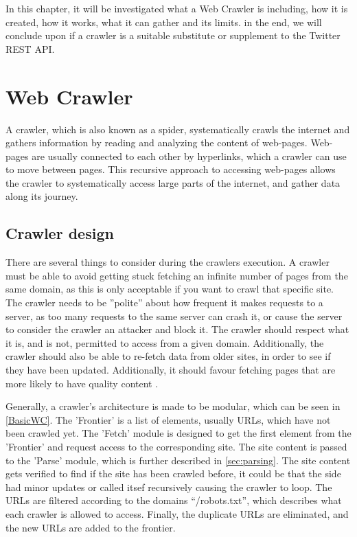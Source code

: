 In this chapter, it will be investigated what a Web Crawler is including, how it
is created, how it works, what it can gather and its limits. in the end, we will
conclude upon if a crawler is a suitable substitute or supplement to
the Twitter \ac{REST} \ac{API}.

\section{Web Crawler}\label{subsec:crawler}
A crawler, which is also known as a spider, systematically crawls the internet
and gathers information by reading and analyzing the content of web-pages.
Web-pages are usually connected to each other by hyperlinks, which a
crawler can use to move between pages. This recursive approach to accessing
web-pages allows the crawler to systematically access large parts of the
internet, and gather data along its journey. \Source %

\subsection{Crawler design}%
There are several things to consider during the crawlers execution. A crawler
must be able to avoid getting stuck fetching an infinite number of pages from
the same domain, as this is only acceptable if you want to crawl that specific
site.
The crawler needs to be ''polite'' about how frequent it makes requests to a
server, as too many requests to the same server can crash it, or cause the
server to consider the crawler an attacker and block it.
The crawler should respect what it is, and is not, permitted to access from a
given domain. Additionally, the crawler should also be able to re-fetch data
from older sites, in order to see if they have been updated. Additionally, it
should favour fetching pages that are more likely to have quality content \citep[Ch.
20.1]{manning2008introduction}.\nl

Generally, a crawler's architecture is made to be modular, which can be seen in
\autoref{BasicWC}. The 'Frontier' is a list of elements, usually URLs, which
have not been crawled yet. The 'Fetch' module is designed to get the first
element from the 'Frontier' and request access to the corresponding site. The
site content is passed to the 'Parse' module, which is further described in
\autoref{sec:parsing}. The site content gets verified to find if the site has
been crawled before, it could be that the side had minor updates or called
itsef recursively causing the crawler to loop.
The URLs are filtered according to the domains ``/robots.txt'', which describes
what each crawler is allowed to access. Finally, the duplicate URLs are
eliminated, and the new URLs are added to the frontier.\nl%


